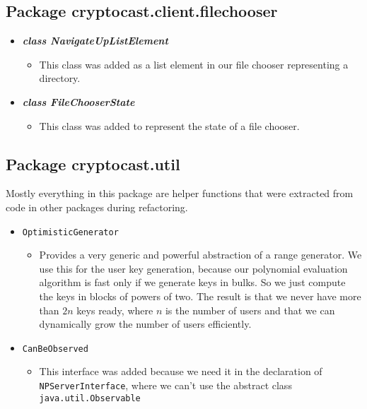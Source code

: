 \documentclass[a4paper,10pt]{scrartcl}
\begin{document}
\subsection{Package cryptocast.client.filechooser}

\begin{itemize}

 \item \textit{\textbf{class NavigateUpListElement}}
  \begin{itemize}
   \item This class was added as a list element in our file chooser representing a directory.
  \end{itemize}

    \item \textbf{\textit{class FileChooserState}}
  \begin{itemize}
   \item This class was added to represent the state of a file chooser.
  \end{itemize}

\end{itemize}

\subsection{Package cryptocast.util}

Mostly everything in this package are helper functions that were extracted from code
in other packages during refactoring.

\begin{itemize}
  \item \lstinline|OptimisticGenerator|
  \begin{itemize}
   \item Provides a very generic and powerful abstraction of a range generator. We use this
	 for the user key generation, because our polynomial evaluation algorithm is fast only
	 if we generate keys in bulks. So we just compute the keys in blocks of powers of two.
	 The result is that we never have more than $2n$ keys ready, where $n$ is the number of users
	 and that we can dynamically grow the number of users efficiently.
  \end{itemize}

  \item \lstinline|CanBeObserved|
  \begin{itemize}
   \item This interface was added because we need it in the declaration of \lstinline|NPServerInterface|,
	 where we can't use the abstract class \lstinline|java.util.Observable|
  \end{itemize}

  \end{itemize}
\end{document}
